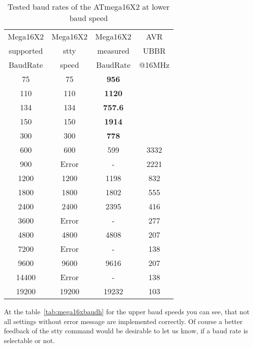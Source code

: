 \begin{table}[H]
  \begin{center}
    \begin{tabular}{| c | c | c || c |}
    \hline
    Mega16X2   & Mega16X2 & Mega16X2   & AVR \\
    supported  & stty  & measured  & UBBR  \\
    BaudRate   & speed & BaudRate  & @16MHz \\
    \hline
    \hline
         75    &  75   & \bf{956} &         \\
    \hline
        110    &  110  & \bf{1120}  &         \\
    \hline
        134    &  134  & \bf{757.6} &        \\
    \hline
        150    & 150   & \bf{1914} &         \\
    \hline
        300    & 300   & \bf{778}  &        \\
    \hline
        600    & 600   &  599     &   3332  \\
    \hline
        900    & Error &   -      &   2221 \\
    \hline
       1200    & 1200  &  1198    &    832  \\
    \hline
       1800    & 1800  &  1802    &    555 \\
    \hline
       2400    & 2400  &  2395    &    416  \\
    \hline
       3600    & Error &    -     &    277  \\
    \hline
       4800    & 4800  &  4808    &    207  \\
    \hline
       7200    & Error &    -     &    138  \\
    \hline
       9600    & 9600  &   9616   &    207  \\
    \hline
      14400    & Error &    -     &    138  \\
    \hline
      19200    & 19200  &  19232  &    103  \\
    \hline
    \end{tabular}
  \end{center}
  \caption{Tested baud rates of the ATmega16X2 at lower baud speed}
  \label{tab:mega16xbaudl}
\end{table}

At the table~\ref{tab:mega16xbaudh} for the upper baud speeds you can see,
that not all settings without error message are implemented correctly.
Of course a better feedback of the stty command would be desirable
to let us know, if a baud rate is selectable or not.

